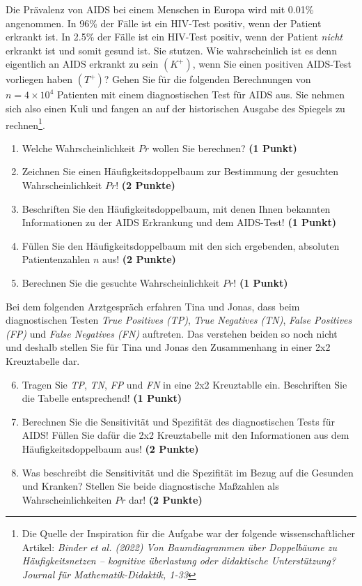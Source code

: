 \documentclass[a4paper, 9pt]{scrartcl}\usepackage[]{graphicx}\usepackage[]{xcolor}
\begin{document}
Die Prävalenz von AIDS bei einem Menschen in Europa wird mit 0.01\% angenommen. In 96\% der Fälle ist ein HIV-Test positiv, wenn der Patient erkrankt ist. In 2.5\% der Fälle ist ein HIV-Test positiv, wenn der Patient \textit{nicht} erkrankt ist und somit gesund ist. Sie stutzen. Wie wahrscheinlich ist es denn eigentlich an AIDS erkrankt zu sein $(K^+)$, wenn Sie einen positiven AIDS-Test vorliegen haben $(T^+)$? Gehen Sie für die folgenden Berechnungen von $n = \ensuremath{4\times 10^{4}}$ Patienten mit einem diagnostischen Test für AIDS aus. Sie nehmen sich also einen Kuli und fangen an auf der historischen Ausgabe des Spiegels zu rechnen\footnote{Die Quelle der Inspiration für die Aufgabe war der folgende wissenschaftlicher Artikel: \textit{Binder et al. (2022) Von Baumdiagrammen über Doppelbäume zu Häufigkeitsnetzen -- kognitive überlastung oder didaktische Unterstützung? Journal für Mathematik-Didaktik, 1-33}}.


\begin{enumerate}
\item Welche Wahrscheinlichkeit $Pr$ wollen Sie berechnen? \textbf{(1 Punkt)}
\item Zeichnen Sie einen Häufigkeitsdoppelbaum zur Bestimmung der gesuchten Wahrscheinlichkeit $Pr$! \textbf{(2 Punkte)} \item Beschriften Sie den Häufigkeitsdoppelbaum, mit denen Ihnen bekannten Informationen zu der AIDS Erkrankung und dem AIDS-Test! \textbf{(1 Punkt)}
\item Füllen Sie den Häufigkeitsdoppelbaum mit den sich ergebenden, absoluten Patientenzahlen $n$ aus! \textbf{(2 Punkte)}
\item Berechnen Sie die gesuchte Wahrscheinlichkeit $Pr$! \textbf{(1 Punkt)}
\end{enumerate}

Bei dem folgenden Arztgespräch erfahren Tina und Jonas, dass beim diagnostischen Testen \textit{True Positives (TP)}, \textit{True Negatives (TN)}, \textit{False Positives (FP)} und \textit{False Negatives (FN)} auftreten. Das verstehen beiden so noch nicht und deshalb stellen Sie für Tina und Jonas den Zusammenhang in einer 2x2 Kreuztabelle dar.

\begin{enumerate}
  \setcounter{enumi}{5}
\item Tragen Sie \textit{TP}, \textit{TN}, \textit{FP} und \textit{FN} in eine 2x2 Kreuztablle ein. Beschriften Sie die Tabelle entsprechend! \textbf{(1 Punkt)}
\item Berechnen Sie die Sensitivität und Spezifität des diagnostischen Tests für AIDS! Füllen Sie dafür die 2x2 Kreuztabelle mit den Informationen aus dem Häufigkeitsdoppelbaum aus! \textbf{(2 Punkte)}
\item Was beschreibt die Sensitivität und die Spezifität im Bezug auf die Gesunden und Kranken? Stellen Sie beide diagnostische Maßzahlen als Wahrscheinlichkeiten $Pr$ dar! \textbf{(2 Punkte)} 
\end{enumerate}
\end{document}
